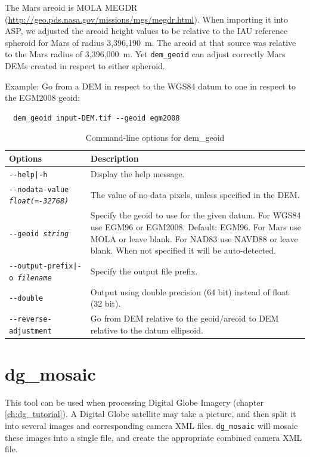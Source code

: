 The Mars areoid is MOLA MEGDR
(\url{http://geo.pds.nasa.gov/missions/mgs/megdr.html}). When importing
it into ASP, we adjusted the areoid height values to be relative to
the IAU reference spheroid for Mars of radius 3,396,190~m. The areoid at that source was
relative to the Mars radius of 3,396,000~m. Yet \texttt{dem\_geoid} can adjust
correctly Mars DEMs created in respect to either spheroid.

Example: Go from a DEM in respect to the WGS84 datum to one in respect to the EGM2008 geoid:
\begin{verbatim}
  dem_geoid input-DEM.tif --geoid egm2008
\end{verbatim}

\begin{longtable}{|l|p{10cm}|}
\caption{Command-line options for dem\_geoid}
\label{tbl:demgeoid}
\endfirsthead
\endhead
\endfoot
\endlastfoot
\hline
Options & Description \\ \hline \hline
\texttt{-\/-help|-h} & Display the help message.\\ \hline
\texttt{-\/-nodata-value \textit{float(=-32768)}} & The value of no-data pixels, unless specified in the DEM. \\ \hline
\texttt{-\/-geoid \textit{string}} &Specify the geoid to use for the given datum. For WGS84 use EGM96 or EGM2008. Default: EGM96. For Mars use MOLA or leave blank. For NAD83 use NAVD88 or leave blank. When not specified it will be auto-detected. \\ \hline
\texttt{-\/-output-prefix|-o \textit{filename}} & Specify the output file prefix. \\ \hline
\texttt{-\/-double} & Output using double precision (64 bit) instead of float (32 bit).\\ \hline
\texttt{-\/-reverse-adjustment} & Go from DEM relative to the geoid/areoid to DEM relative to the datum ellipsoid.\\ \hline
\end{longtable}

\section{dg\_mosaic}
\label{dgmosaic}

This tool can be used when processing Digital Globe Imagery (chapter
\ref{ch:dg_tutorial}). A Digital Globe satellite may take a
picture, and then split it into several images and corresponding camera
XML files. \texttt{dg\_mosaic} will mosaic these images into a single
file, and create the appropriate combined camera XML file.

